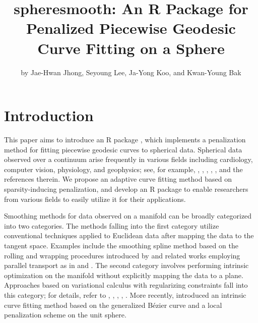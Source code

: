 \title{spheresmooth: An R Package for Penalized Piecewise Geodesic Curve Fitting on a Sphere}


\author{by Jae-Hwan Jhong, Seyoung Lee, Ja-Yong Koo, and Kwan-Young Bak}

\maketitle


\section{Introduction}\label{introduction}

This paper aims to introduce an R package , which implements a penalization method for fitting piecewise geodesic curves to spherical data. Spherical data observed over a continuum arise frequently in various fields including cardiology, computer vision, physiology, and geophysics; see, for example, \citet{gould1969regression}, \citet{jupp1987fitting}, \citet{kume2007shape}, \citet{su2012fitting}, \citet{thompson1982robust}, and the references therein. We propose an adaptive curve fitting method based on sparsity-inducing penalization, and develop an R package to enable researchers from various fields to easily utilize it for their applications.

Smoothing methods for data observed on a manifold can be broadly categorized into two categories. The methods falling into the first category utilize conventional techniques applied to Euclidean data after mapping the data to the tangent space. Examples include the smoothing spline method based on the rolling and wrapping procedures introduced by \citet{jupp1987fitting} and related works employing parallel transport as in \citet{kume2007shape} and \citet{kim2021smoothing}. The second category involves performing intrinsic optimization on the manifold without explicitly mapping the data to a plane. Approaches based on variational calculus with regularizing constraints fall into this category; for details, refer to \citet{camarinha1995splines}, \citet{noakes1989cubic}, \citet{samir2012gradient}, \citet{su2012fitting}, \citet{machado2006riemannian}. More recently, \citet{bak2023intrinsic} introduced an intrinsic curve fitting method based on the generalized Bézier curve and a local penalization scheme on the unit sphere.

